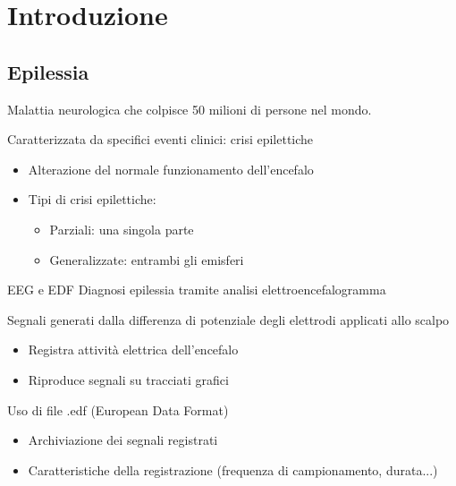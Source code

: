 \documentclass[xcolor=x11names,compress, 
					handout %
]{beamer}
\theoremstyle{definition} \newtheorem{esempio}{Esempio}
\theoremstyle{definition}
\begin{document}
\section{Introduzione}
		
	\subsection{Epilessia}
		\begin{frame}{\subsecname}
			Malattia neurologica che colpisce 50 milioni di persone nel mondo.
			
			 Caratterizzata da specifici eventi clinici: crisi epilettiche
			\begin{itemize}
				\item Alterazione del normale funzionamento dell'encefalo
				\item Tipi di crisi epilettiche:
				 \begin{itemize}
				 	\item Parziali: una singola parte
				 	\item Generalizzate: entrambi gli emisferi
				 \end{itemize}
			\end{itemize}
		\end{frame}
		
		\begin{frame}{EEG e EDF}
			Diagnosi epilessia tramite analisi elettroencefalogramma
			
			Segnali generati dalla differenza di potenziale degli elettrodi applicati allo scalpo
			
			\begin{itemize}
				\item Registra attività elettrica dell'encefalo
				\item Riproduce segnali su tracciati grafici
			\end{itemize}
			
			Uso di file .edf (European Data Format) 
			\begin{itemize}
				\item Archiviazione dei segnali registrati
				\item Caratteristiche della registrazione (frequenza di campionamento, durata...)
			\end{itemize}
		\end{frame}
	
\end{document}
